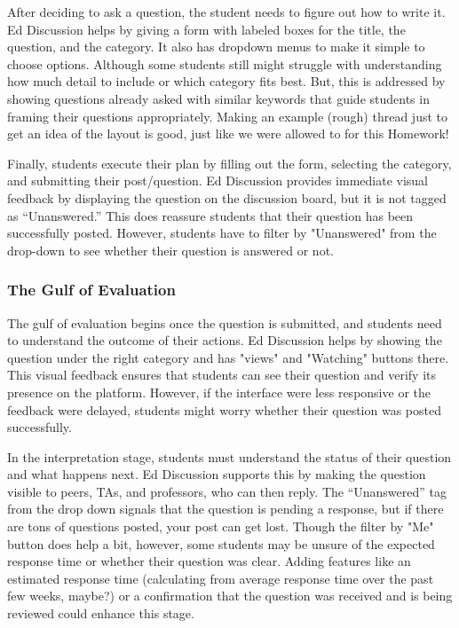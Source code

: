 \documentclass[
	letterpaper, %
]{jdf}
\begin{document}
After deciding to ask a question, the student needs to figure out how to write it. Ed Discussion helps by giving a form with labeled boxes for the title, the question, and the category. It also has dropdown menus to make it simple to choose options. Although some students still might struggle with understanding how much detail to include or which category fits best. But, this is addressed by showing questions already asked with similar keywords that guide students in framing their questions appropriately. Making an example (rough) thread just to get an idea of the layout is good, just like we were allowed to for this Homework!

Finally, students execute their plan by filling out the form, selecting the category, and submitting their post/question. Ed Discussion provides immediate visual feedback by displaying the question on the discussion board, but it is not tagged as “Unanswered.” This does reassure students that their question has been successfully posted. However, students have to filter by "Unanswered" from the drop-down to see whether their question is answered or not. 

\subsubsection {The Gulf of Evaluation}
The gulf of evaluation begins once the question is submitted, and students need to understand the outcome of their actions. Ed Discussion helps by showing the question under the right category and has "views" and "Watching" buttons there. This visual feedback ensures that students can see their question and verify its presence on the platform. However, if the interface were less responsive or the feedback were delayed, students might worry whether their question was posted successfully.

In the interpretation stage, students must understand the status of their question and what happens next. Ed Discussion supports this by making the question visible to peers, TAs, and professors, who can then reply. The “Unanswered” tag from the drop down signals that the question is pending a response, but if there are tons of questions posted, your post can get lost. Though the filter by "Me" button does help a bit, however, some students may be unsure of the expected response time or whether their question was clear. Adding features like an estimated response time (calculating from average response time over the past few weeks, maybe?) or a confirmation that the question was received and is being reviewed could enhance this stage.
\end{document}
